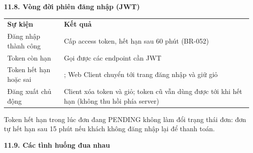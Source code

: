 \documentclass[11pt,a4paper,oneside]{report}
\begin{document}
\textbf{11.8. Vòng đời phiên đăng nhập (JWT)}

\begin{longtable}[]{@{}
  >{\raggedright\arraybackslash}p{}
  >{\raggedright\arraybackslash}p{}@{}}
\toprule\noalign{}
\endhead
\bottomrule\noalign{}
\endlastfoot
\textbf{Sự kiện} & \textbf{Kết quả} \\
Đăng nhập thành công & Cấp access token, hết hạn sau 60 phút (BR-052) \\
Token còn hạn & Gọi được các endpoint cần JWT \\
Token hết hạn hoặc sai & 401; Web Client chuyển tới trang đăng nhập và giữ giỏ \\
Đăng xuất chủ động & Client xóa token và giỏ; token cũ vẫn dùng được tới khi hết hạn (không thu hồi phía server) \\
\end{longtable}

Token hết hạn trong lúc đơn đang PENDING không làm đổi trạng thái đơn: đơn tự hết hạn sau 15 phút nếu khách không đăng nhập lại để thanh toán.

\textbf{11.9. Các tình huống đua nhau}
\end{document}
